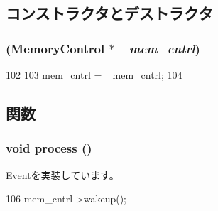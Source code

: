 \subsection{コンストラクタとデストラクタ}
\hypertarget{classMemoryControl_1_1MemCntrlEvent_ae3167b7e2836b30c5faff458cab95248}{
\subsubsection[{MemCntrlEvent}]{ ({\bf MemoryControl} $\ast$ {\em \_\-mem\_\-cntrl})}}
\label{classMemoryControl_1_1MemCntrlEvent_ae3167b7e2836b30c5faff458cab95248}



\begin{DoxyCode}
102         {
103             mem_cntrl = _mem_cntrl;
104         }
\end{DoxyCode}


\subsection{関数}
\hypertarget{classMemoryControl_1_1MemCntrlEvent_a2e9c5136d19b1a95fc427e0852deab5c}{
\subsubsection[{process}]{\setlength{\rightskip}{0pt plus 5cm}void process ()}}
\label{classMemoryControl_1_1MemCntrlEvent_a2e9c5136d19b1a95fc427e0852deab5c}


\hyperlink{classEvent_a142b75b68a6291400e20fb0dd905b1c8}{Event}を実装しています。


\begin{DoxyCode}
106 { mem_cntrl->wakeup(); }
\end{DoxyCode}


